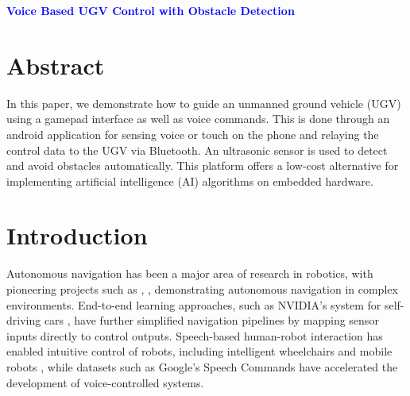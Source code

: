 \documentclass[a4paper,12pt]{article}
\begin{document}
\thispagestyle{firstpage}

\vspace*{1cm}
\begin{center}
    {\LARGE \textbf{\textcolor{blue}{Voice Based UGV Control with Obstacle Detection}}}
\end{center}

\section*{Abstract}
In this paper, we demonstrate how to guide an unmanned ground vehicle (UGV) using a gamepad interface as well as voice commands. This is done through an android application for sensing voice or touch on the phone and relaying the control data to the UGV via Bluetooth. An ultrasonic sensor is used to detect and avoid obstacles automatically. This platform offers a low-cost alternative for implementing artificial intelligence (AI) algorithms on embedded hardware.

\section{Introduction}
Autonomous navigation has been a major area of research in robotics, with pioneering projects such as 
\cite{thrun2006stanley}, 
\cite{urmson2008boss, montemerlo2008junior}, demonstrating autonomous navigation in complex environments. 
End-to-end learning approaches, such as NVIDIA's system for self-driving cars \cite{bojarski2016end}, have further simplified navigation pipelines by mapping sensor inputs directly to control outputs. 
Speech-based human-robot interaction has enabled intuitive control of robots, including intelligent wheelchairs and mobile robots \cite{li2017speech, prasad2013voice, vasudevan2010speech}, while datasets such as Google’s Speech Commands \cite{warden2018speech} have accelerated the development of voice-controlled systems. 
\end{document}
